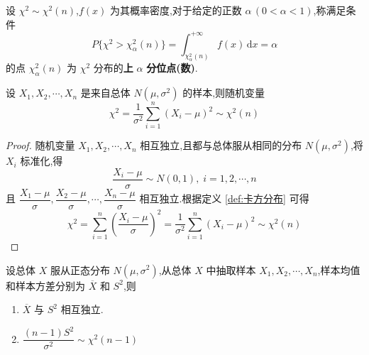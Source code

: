 \begin{definition}
    设 $\chi^2 \sim \chi^2(n)$,$f(x)$ 为其概率密度,对于给定的正数 $\alpha \, (0 < \alpha < 1)$,称满足条件
    $$
    P \{ \chi^2 > \chi_{\alpha}^2(n) \} = \int_{\chi_{\alpha}^2(n)}^{+\infty} f(x) \, \text{d}x = \alpha
    $$
    的点 $\chi_{\alpha}^2(n)$ 为 $\chi^2$ 分布的\textbf{上} $\alpha$ \textbf{分位点(数)}.
\end{definition}

\begin{theorem} \label{theorem:来自正态总体的样本标准化后求和,服从卡方分布}
    设 $X_1,X_2,\cdots,X_n$ 是来自总体 $N(\mu,\sigma^2)$ 的样本,则随机变量
    $$
    \chi^2 = \dfrac{1}{\sigma^2} \sum_{i=1}^n (X_i - \mu)^2 \sim \chi^2(n)
    $$
\end{theorem}

\begin{proof}
    随机变量 $X_1,X_2,\cdots,X_n$ 相互独立,且都与总体服从相同的分布 $N(\mu,\sigma^2)$,将 $X_i$ 标准化,得
    $$
    \dfrac{X_i - \mu}{\sigma} \sim N(0,1), \; i=1,2,\cdots,n
    $$
    且 $\dfrac{X_1 - \mu}{\sigma}, \dfrac{X_2 - \mu}{\sigma},\cdots, \dfrac{X_n - \mu}{\sigma}$ 相互独立.根据定义 \ref{def:卡方分布} 可得
    $$
    \chi^2 = \sum_{i=1}^n \left( \dfrac{X_i - \mu}{\sigma} \right)^2 = \dfrac{1}{\sigma^2} \sum_{i=1}^n (X_i - \mu)^2 \sim \chi^2(n)
    $$
\end{proof}

\begin{theorem} \label{theorem:正态总体的样本均值与样本方差相互独立}
    设总体 $X$ 服从正态分布 $N(\mu,\sigma^2)$,从总体 $X$ 中抽取样本 $X_1,X_2,\cdots,X_n$,样本均值和样本方差分别为 $\overline{X}$ 和 $S^2$,则

    \begin{enumerate}
        \item $\overline{X}$ 与 $S^2$ 相互独立. \vspace{0.5em}
        \item $\dfrac{(n-1) S^2}{\sigma^2} \sim \chi^2(n-1)$
    \end{enumerate}
\end{theorem}

\vspace{-1.8em}

